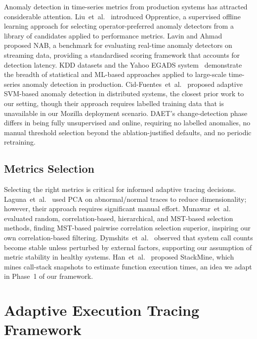 \documentclass[pdflatex,sn-nature]{sn-jnl}
\theoremstyle{thmstyleone}%
\begin{document}
Anomaly detection in time-series metrics from production systems has attracted
considerable attention.
Liu~et~al.~\cite{liu2015opprentice} introduced Opprentice, a supervised offline
learning approach for selecting operator-preferred anomaly detectors from
a library of candidates applied to performance metrics.
Lavin and Ahmad~\cite{lavin2015evaluating} proposed NAB, a benchmark for
evaluating real-time anomaly detectors on streaming data, providing a
standardised scoring framework that accounts for detection latency.
KDD datasets and the Yahoo EGADS system~\cite{laptev2015generic} demonstrate
the breadth of statistical and ML-based approaches applied to large-scale
time-series anomaly detection in production.
Cid-Fuentes~et~al.~\cite{cid2018adaptive} proposed adaptive SVM-based anomaly
detection in distributed systems, the closest prior work to our setting,
though their approach requires labelled training data that is unavailable
in our Mozilla deployment scenario.
DAET's change-detection phase differs in being fully unsupervised and online,
requiring no labelled anomalies, no manual threshold selection beyond the
ablation-justified defaults, and no periodic retraining.

\subsection{Metrics Selection}
Selecting the right metrics is critical for informed adaptive tracing
decisions.
Laguna~et~al.~\cite{laguna2013automatic} used PCA on abnormal/normal traces
to reduce dimensionality; however, their approach requires significant manual
effort.
Munawar~et~al.~\cite{munawar2009filtering} evaluated random, correlation-based,
hierarchical, and MST-based selection methods, finding MST-based pairwise
correlation selection superior, inspiring our own correlation-based filtering.
Dymshits~et~al.~\cite{dymshits2017process} observed that system call counts
become stable unless perturbed by external factors, supporting our assumption
of metric stability in healthy systems.
Han~et~al.~\cite{han2012performance} proposed StackMine, which mines call-stack
snapshots to estimate function execution times, an idea we adapt in Phase~1
of our framework.

\section{Adaptive Execution Tracing Framework}\label{sec:framework}
\end{document}
